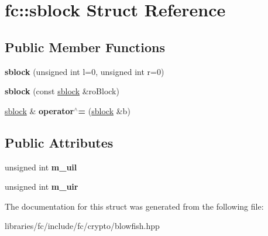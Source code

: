 \hypertarget{structfc_1_1sblock}{}\section{fc\+:\+:sblock Struct Reference}
\label{structfc_1_1sblock}
\subsection*{Public Member Functions}
\begin{DoxyCompactItemize}
\item 
\mbox{\label{structfc_1_1sblock_abacfce927b4903c1c4e68b6a1a0a7435}} 
{\bfseries sblock} (unsigned int l=0, unsigned int r=0)
\item 
\mbox{\label{structfc_1_1sblock_a19ba39ebb027cd9041d5187da827c2b5}} 
{\bfseries sblock} (const \mbox{\hyperlink{structfc_1_1sblock}{sblock}} \&ro\+Block)
\item 
\mbox{\label{structfc_1_1sblock_a357e3c3504e1bb224adad021ff4e787f}} 
\mbox{\hyperlink{structfc_1_1sblock}{sblock}} \& {\bfseries operator$^\wedge$=} (\mbox{\hyperlink{structfc_1_1sblock}{sblock}} \&b)
\end{DoxyCompactItemize}
\subsection*{Public Attributes}
\begin{DoxyCompactItemize}
\item 
\mbox{\label{structfc_1_1sblock_a47f86b4689f98ce75d61cf3b163311ea}} 
unsigned int {\bfseries m\+\_\+uil}
\item 
\mbox{\label{structfc_1_1sblock_ab7bc3efb7f0e64dcb54715b9649ac412}} 
unsigned int {\bfseries m\+\_\+uir}
\end{DoxyCompactItemize}


The documentation for this struct was generated from the following file\+:\begin{DoxyCompactItemize}
\item 
libraries/fc/include/fc/crypto/blowfish.\+hpp\end{DoxyCompactItemize}
